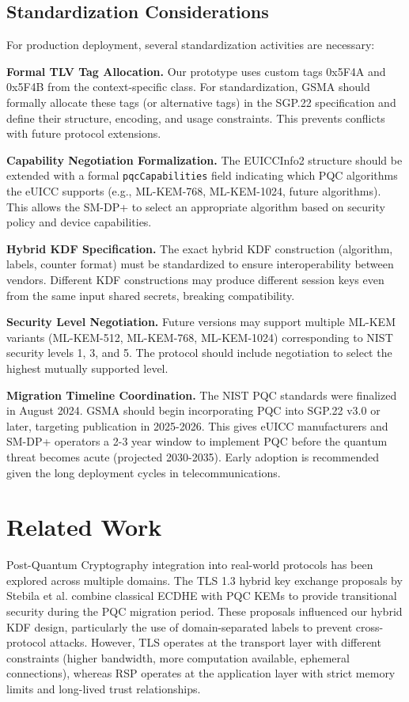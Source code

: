 \documentclass{easychair}
\begin{document}
\subsection{Standardization Considerations}

For production deployment, several standardization activities are necessary:

\textbf{Formal TLV Tag Allocation.} Our prototype uses custom tags 0x5F4A and 0x5F4B from the context-specific class. For standardization, GSMA should formally allocate these tags (or alternative tags) in the SGP.22 specification and define their structure, encoding, and usage constraints. This prevents conflicts with future protocol extensions.

\textbf{Capability Negotiation Formalization.} The EUICCInfo2 structure should be extended with a formal \texttt{pqcCapabilities} field indicating which PQC algorithms the eUICC supports (e.g., ML-KEM-768, ML-KEM-1024, future algorithms). This allows the SM-DP+ to select an appropriate algorithm based on security policy and device capabilities.

\textbf{Hybrid KDF Specification.} The exact hybrid KDF construction (algorithm, labels, counter format) must be standardized to ensure interoperability between vendors. Different KDF constructions may produce different session keys even from the same input shared secrets, breaking compatibility.

\textbf{Security Level Negotiation.} Future versions may support multiple ML-KEM variants (ML-KEM-512, ML-KEM-768, ML-KEM-1024) corresponding to NIST security levels 1, 3, and 5. The protocol should include negotiation to select the highest mutually supported level.

\textbf{Migration Timeline Coordination.} The NIST PQC standards were finalized in August 2024. GSMA should begin incorporating PQC into SGP.22 v3.0 or later, targeting publication in 2025-2026. This gives eUICC manufacturers and SM-DP+ operators a 2-3 year window to implement PQC before the quantum threat becomes acute (projected 2030-2035). Early adoption is recommended given the long deployment cycles in telecommunications.

\section{Related Work}

Post-Quantum Cryptography integration into real-world protocols has been explored across multiple domains. The TLS 1.3 hybrid key exchange proposals by Stebila et al. combine classical ECDHE with PQC KEMs to provide transitional security during the PQC migration period. These proposals influenced our hybrid KDF design, particularly the use of domain-separated labels to prevent cross-protocol attacks. However, TLS operates at the transport layer with different constraints (higher bandwidth, more computation available, ephemeral connections), whereas RSP operates at the application layer with strict memory limits and long-lived trust relationships.
\end{document}

